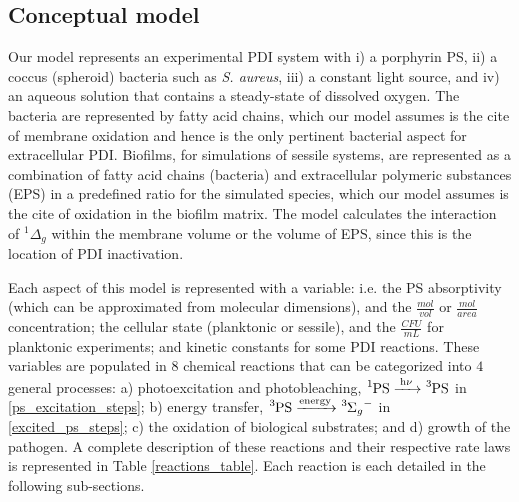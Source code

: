 \subsection*{Conceptual model}
Our model represents an experimental PDI system with i) a porphyrin PS, ii) a coccus (spheroid) bacteria such as \textit{S. aureus}, iii) a constant light source, and iv) an aqueous solution that contains a steady-state of dissolved oxygen. The bacteria are represented by fatty acid chains, which our model assumes is the cite of membrane oxidation and hence is the only pertinent bacterial aspect for extracellular PDI. Biofilms, for simulations of sessile systems, are represented as a combination of fatty acid chains (bacteria) and extracellular polymeric substances (EPS) in a predefined ratio for the simulated species, which our model assumes is the cite of oxidation in the biofilm matrix. The model calculates the interaction of $^1\Delta_g$ within the membrane volume or the volume of EPS, since this is the location of PDI inactivation.

Each aspect of this model is represented with a variable: i.e. the PS absorptivity (which can be approximated from molecular dimensions), and the $\frac{mol}{vol}$ or $\frac{mol}{area}$ concentration; the cellular state (planktonic or sessile), and the $\frac{CFU}{mL}$ for planktonic experiments; and kinetic constants for some PDI reactions. These variables are populated in $8$ chemical reactions that can be categorized into $4$ general processes: a) photoexcitation and photobleaching, $\ce{^1PS ->[h\nu] ^3PS}$ in \cref{ps_excitation_steps}; b) energy transfer, $\ce{^3PS ->[energy] ^3\Sigma_g^-}$ in \cref{excited_ps_steps}; c) the oxidation of biological substrates; and d) growth of the pathogen. A complete description of these reactions and their respective rate laws is represented in Table \ref{reactions_table}. Each reaction is each detailed in the following sub-sections.

